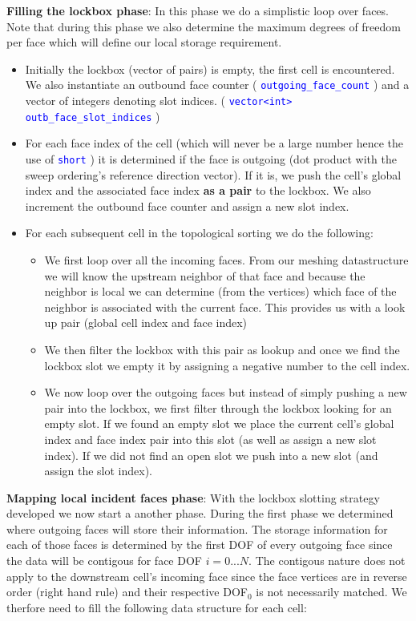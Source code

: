 \documentclass[11pt,letterpaper,titlepage]{article}
\newcommand{\xmltag}[1]{\textcolor{blue}{ \texttt{#1}} }
\numberwithin{equation}{section}
\begin{document}
\textbf{Filling the lockbox phase}:\newline
In this phase we do a simplistic loop over faces. Note that during this phase we also determine the maximum degrees of freedom per face which will define our local storage requirement.
\begin{itemize}
\item Initially the lockbox (vector of pairs) is empty, the first cell is encountered. We also instantiate an outbound face counter (\xmltag{outgoing\_face\_count}) and a vector of integers denoting slot indices.
 (\xmltag{vector<int> outb\_face\_slot\_indices})
\item For each face index of the cell (which will never be a large number hence the use of \xmltag{short}) it is determined if the face is outgoing (dot product with the sweep ordering's reference direction vector). If it is, we push the cell's global index and the associated face index \textbf{as a pair} to the lockbox. We also increment the outbound face counter and assign a new slot index.
\item For each subsequent cell in the topological sorting we do the following:
\begin{itemize}
\item We first loop over all the incoming faces. From our meshing datastructure we will know the upstream neighbor of that face and because the neighbor is local we can determine (from the vertices) which face of the neighbor is associated with the current face. This provides us with a look up pair (global cell index and face index)
\item We then filter the lockbox with this pair as lookup and once we find the lockbox slot we empty it by assigning a negative number to the cell index.
\item We now loop over the outgoing faces but instead of simply pushing a new pair into the lockbox, we first filter through the lockbox looking for an empty slot. If we found an empty slot we place the current cell's global index and face index pair into this slot (as well as assign a new slot index). If we did not find an open slot we push into a new slot (and assign the slot index).
\end{itemize}

\end{itemize}

\textbf{Mapping local incident faces phase}:\newline
With the lockbox slotting strategy developed we now start a another phase. During the first phase we determined where outgoing faces will store their information. The storage information for each of those faces is determined by the first DOF of every outgoing face since the data will be contigous for face DOF $i=0...N$. The contigous nature does not apply to the downstream cell's incoming face since the face vertices are in reverse order (right hand rule) and their respective DOF$_0$ is not necessarily matched. We therfore need to fill the following data structure for each cell:\newline
\end{document}
